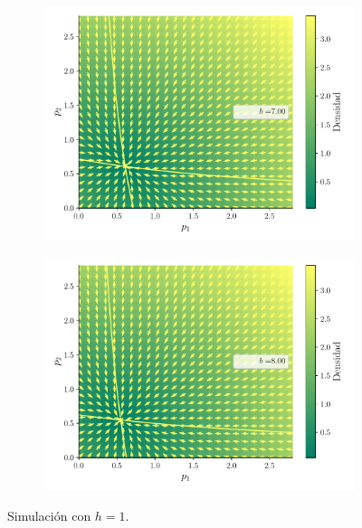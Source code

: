 \documentclass[twocolumn,aps,prl]{revtex4-1}
\begin{document}
\begin{figure}[ht!]
\begin{subfigure}[b]{0.49\linewidth}
      \includegraphics[width = 0.999\textwidth]{figuras/ex02-cosa3-6.pdf}
  \end{subfigure}\quad
  \begin{subfigure}[b]{0.49\linewidth}
      \centering
      \includegraphics[width = 0.999\textwidth]{figuras/ex02-cosa3-7.pdf}
  \end{subfigure}\quad
  \caption{Simulación con $h=1$.}
  \label{fig:figuras/ex02-cosa3}
\end{figure}
\end{document}
